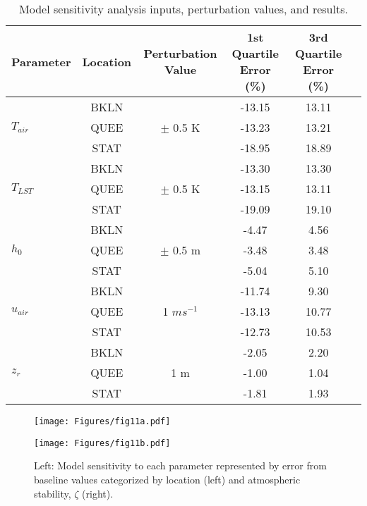 \begin{table}[!h]
\centering
\caption{Model sensitivity analysis inputs, perturbation values, and results.}
    \begin{tabular}[t]{lccccc}
        \hline
        Parameter & Location & Perturbation Value & 1st Quartile Error (\%) & 3rd Quartile Error (\%) \\
        \hline
        \multirow{3}{*}{$T_{air}$} & BKLN &   & -13.15 & 13.11 \\
                                   & QUEE & $\pm$ 0.5 K & -13.23 & 13.21 \\
                                   & STAT &   & -18.95 & 18.89 \\
        \multirow{3}{*}{$T_{LST}$} & BKLN &   & -13.30 & 13.30 \\
                                   & QUEE & $\pm$ 0.5 K & -13.15 & 13.11 \\
                                   & STAT &   & -19.09 & 19.10 \\
        \multirow{3}{*}{$h_0$} & BKLN &   & -4.47 & 4.56 \\
                                   & QUEE & $\pm$ 0.5 m & -3.48 & 3.48 \\
                                   & STAT &   & -5.04 & 5.10 \\
        \multirow{3}{*}{$u_{air}$} & BKLN &   & -11.74 & 9.30 \\
                                   & QUEE & 1 $m s^{-1}$ & -13.13 & 10.77 \\
                                   & STAT &   & -12.73 & 10.53 \\
        \multirow{3}{*}{$z_r$} & BKLN &   & -2.05 & 2.20 \\
                                   & QUEE & 1 m & -1.00 & 1.04 \\
                                   & STAT &   & -1.81 & 1.93 \\
        \hline
    \end{tabular}
    \label{tab:sensitivity-analysis-stats}
\end{table}%

\begin{figure}[!h]
    \centering
    \begin{minipage}{0.48\textwidth}
        \centering
        \texttt{[image: Figures/fig11a.pdf]} %
    \end{minipage}\hfill
    \begin{minipage}{0.48\textwidth}
        \centering
        \texttt{[image: Figures/fig11b.pdf]} %
    \end{minipage}\hfill
    \caption{Left: Model sensitivity to each parameter represented by error from baseline values categorized by location (left) and atmospheric stability, $\zeta$ (right).}
    \label{fig:sensitivity-study} 
\end{figure}


